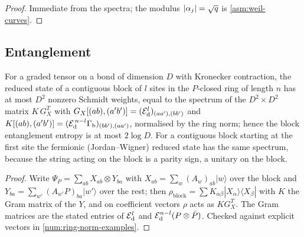 \begin{proof}
Immediate from the spectra; the modulus $|\alpha_{j}| = \sqrt{q}$ is \cref{asm:weil-curves}.
\end{proof}

\subsection{Entanglement}

\begin{proposition}
\label{prop:example-block-spectrum}
For a graded tensor on a bond of dimension $D$ with Kronecker contraction, the reduced state of
a contiguous block of $l$ sites in the $P$-closed ring of length $n$ has at most $D^2$ nonzero
Schmidt weights, equal to the spectrum of the $D^2\times D^2$ matrix $K\,G_X^{T}$ with
$G_X[(ab),(a'b')] = (\mathcal E_{\mathrm d}^l)_{(aa'),(bb')}$ and $K[(ab),(a'b')] = (\mathcal E_{\mathrm d}^{\,n-l}\Gamma_{\mathrm b})_{(bb'),(aa')}$,
normalised by the ring norm; hence the block entanglement entropy is at most $2\log D$. For a
contiguous block starting at the first site the fermionic (Jordan--Wigner) reduced state has
the same spectrum, because the string acting on the block is a parity sign, a unitary on the
block.
\end{proposition}

\begin{proof}
Write $\Psi_P = \sum_{ab}X_{ab}\otimes Y_{ba}$ with $X_{ab} = \sum_w(A_w)_{ab}|w\rangle$ over the
block and $Y_{ba} = \sum_{w'}(A_{w'}P)_{ba}|w'\rangle$ over the rest; then
$\rho_{\mathrm{block}} = \sum K_{\alpha\beta}|X_\alpha\rangle\langle X_\beta|$ with $K$ the Gram matrix of the %
$Y$, and on coefficient vectors $\rho$ acts as $K G_X^T$. The Gram matrices are the stated %
entries of $\mathcal E_{\mathrm d}^l$ and $\mathcal E_{\mathrm d}^{n-l}(P\otimes\bar P)$. Checked against explicit vectors in
\cref{num:ring-norm-examples}.
\end{proof}

